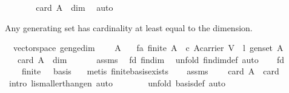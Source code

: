 \begin{isabellebody}
\ \ \isamarkupfalse%
\ {}\ {}\ \isamarkupfalse%
\ {\isachardoublequoteopen}card\ A\ {\isasymle}\ dim{\isachardoublequoteclose}\ \isamarkupfalse%
\ auto\isanewline
{}\isamarkupfalse%
%
\endisatagproof
{\isafoldproof}%
%
\isadelimproof
%
\endisadelimproof
%
\begin{isamarkuptext}%
Any generating set has cardinality at least equal to the dimension.%
\end{isamarkuptext}%
\isamarkuptrue%
\isamarkupfalse%
\ {\isacharparenleft}\ vectorspace{\isacharparenright}\ gen{\isacharunderscore}ge{\isacharunderscore}dim{\isacharcolon}\ \isanewline
\ \ \ A\isanewline
\ \ \ fa{\isacharcolon}\ {\isachardoublequoteopen}finite\ A{\isachardoublequoteclose}\ \ c{\isacharcolon}\ {\isachardoublequoteopen}A{\isasymsubseteq}carrier\ V{\isachardoublequoteclose}\ \ l{\isacharcolon}\ {\isachardoublequoteopen}gen{\isacharunderscore}set\ A{\isachardoublequoteclose}\isanewline
\ \ \ {\isachardoublequoteopen}card\ A\ {\isasymge}\ dim{\isachardoublequoteclose}\isanewline
%
\isadelimproof
%
\endisadelimproof
%
\isatagproof
{}\isamarkupfalse%
\ \ {\isacharminus}\isanewline
\ \ \isamarkupfalse%
\ assms\ \isamarkupfalse%
\ fd{\isacharcolon}\ {\isachardoublequoteopen}fin{\isacharunderscore}dim{\isachardoublequoteclose}\ \isamarkupfalse%
\ {\isacharparenleft}unfold\ fin{\isacharunderscore}dim{\isacharunderscore}def{\isacharcomma}\ auto{\isacharparenright}\isanewline
\ \ \isamarkupfalse%
\ fd\ \isamarkupfalse%
\ {\isasymbeta}\ \ {}{\isacharcolon}\ {\isachardoublequoteopen}finite\ {\isasymbeta}\ {\isasymand}\ basis\ {\isasymbeta}{\isachardoublequoteclose}\ \isamarkupfalse%
\ {\isacharparenleft}metis\ finite{\isacharunderscore}basis{\isacharunderscore}exists{\isacharparenright}\isanewline
\ \ \isamarkupfalse%
\ assms\ {}\ \isamarkupfalse%
\ {}{\isacharcolon}\ {\isachardoublequoteopen}card\ A\ {\isasymge}\ card\ {\isasymbeta}{\isachardoublequoteclose}\ \isanewline
\ \ \ \ \isamarkupfalse%
\ {\isacharparenleft}intro\ li{\isacharunderscore}smaller{\isacharunderscore}than{\isacharunderscore}gen{\isacharcomma}\ auto{\isacharparenright}\ \isanewline
\ \ \ \ \ \isamarkupfalse%
\ {\isacharparenleft}unfold\ basis{\isacharunderscore}def{\isacharcomma}\ auto{\isacharparenright}\isanewline

\end{isabellebody}
